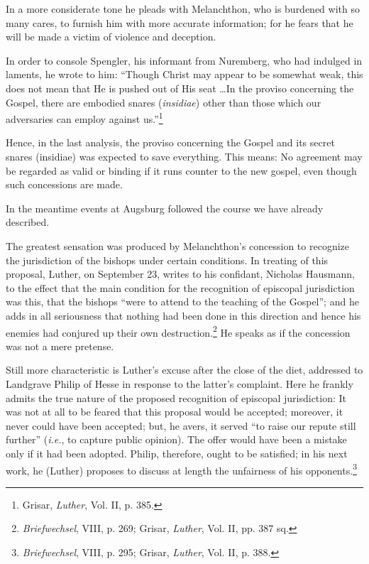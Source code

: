 In a more considerate tone he pleads with Melanchthon, who is burdened
with so many cares, to furnish him with more accurate information; for
he fears that he will be made a victim of violence and
deception.

In order to console Spengler, his informant from Nuremberg, who
had indulged in laments, he wrote to him: “Though Christ may
appear to be somewhat weak, this does not mean that He is pushed out
of His seat \dots In the proviso concerning the Gospel, there are embodied
snares (\textit{insidiae}) other than those which our adversaries can
employ against us.”\footnote{Grisar, \textit{Luther}, Vol. II, p. 385.}

Hence, in the last analysis, the proviso concerning
the Gospel and its secret snares (insidiae) was expected to save
everything. This means: No agreement may be regarded as valid or
binding if it runs counter to the new gospel, even though such concessions are made.

In the meantime events at Augsburg followed the course we have
already described.

The greatest sensation was produced by Melanchthon’s concession
to recognize the jurisdiction of the bishops under certain conditions.
In treating of this proposal, Luther, on September 23, writes to his
confidant, Nicholas Hausmann, to the effect that the main condition
for the recognition of episcopal jurisdiction was this, that the bishops
“were to attend to the teaching of the Gospel”; and he adds in all
seriousness that nothing had been done in this direction and hence
his enemies had conjured up their own destruction.\footnote{\textit{Briefwechsel}, VIII, p. 269; Grisar, \textit{Luther}, Vol. II, pp. 387 sq.}
 He speaks as if
the concession was not a mere pretense.

Still more characteristic is Luther’s excuse after the close of the
diet, addressed to Landgrave Philip of Hesse in response to the latter’s
complaint. Here he frankly admits the true nature of the proposed recognition
of episcopal jurisdiction: It was not at all to be
feared that this proposal would be accepted; moreover, it never could
have been accepted; but, he avers, it served “to raise our repute still
further” (\textit{i.e.}, to capture public opinion). The offer would have been
a mistake only if it had been adopted. Philip, therefore, ought to be
satisfied; in his next work, he (Luther) proposes to discuss at length
the unfairness of his opponents.\footnote{\textit{Briefwechsel}, VIII, p. 295; Grisar, \textit{Luther}, Vol. II, p. 388.}

